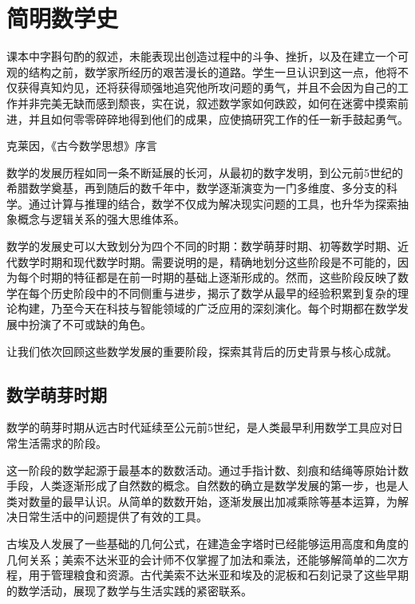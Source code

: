 \section{简明数学史}

课本中字斟句酌的叙述，未能表现出创造过程中的斗争、挫折，以及在建立一个可观的结构之前，数学家所经历的艰苦漫长的道路。学生一旦认识到这一点，他将不仅获得真知灼见，还将获得顽强地追究他所攻问题的勇气，并且不会因为自己的工作并非完美无缺而感到颓丧，实在说，叙述数学家如何跌跤，如何在迷雾中摸索前进，并且如何零零碎碎地得到他们的成果，应使搞研究工作的任一新手鼓起勇气。   
\begin{flushright}
                                                 克莱因，《古今数学思想》序言
\end{flushright}


数学的发展历程如同一条不断延展的长河，从最初的数字发明，到公元前5世纪的希腊数学奠基，再到随后的数千年中，数学逐渐演变为一门多维度、多分支的科学。通过计算与推理的结合，数学不仅成为解决现实问题的工具，也升华为探索抽象概念与逻辑关系的强大思维体系。

数学的发展史可以大致划分为四个不同的时期：数学萌芽时期、初等数学时期、近代数学时期和现代数学时期。需要说明的是，精确地划分这些阶段是不可能的，因为每个时期的特征都是在前一时期的基础上逐渐形成的。然而，这些阶段反映了数学在每个历史阶段中的不同侧重与进步，揭示了数学从最早的经验积累到复杂的理论构建，乃至今天在科技与智能领域的广泛应用的深刻演化。每个时期都在数学发展中扮演了不可或缺的角色。

让我们依次回顾这些数学发展的重要阶段，探索其背后的历史背景与核心成就。

\subsection{数学萌芽时期}
数学的萌芽时期从远古时代延续至公元前5世纪，是人类最早利用数学工具应对日常生活需求的阶段。

这一阶段的数学起源于最基本的数数活动。通过手指计数、刻痕和结绳等原始计数手段，人类逐渐形成了自然数的概念。自然数的确立是数学发展的第一步，也是人类对数量的最早认识。从简单的数数开始，逐渐发展出加减乘除等基本运算，为解决日常生活中的问题提供了有效的工具。

古埃及人发展了一些基础的几何公式，在建造金字塔时已经能够运用高度和角度的几何关系；美索不达米亚的会计师不仅掌握了加法和乘法，还能够解简单的二次方程，用于管理粮食和资源。古代美索不达米亚和埃及的泥板和石刻记录了这些早期的数学活动，展现了数学与生活实践的紧密联系。


